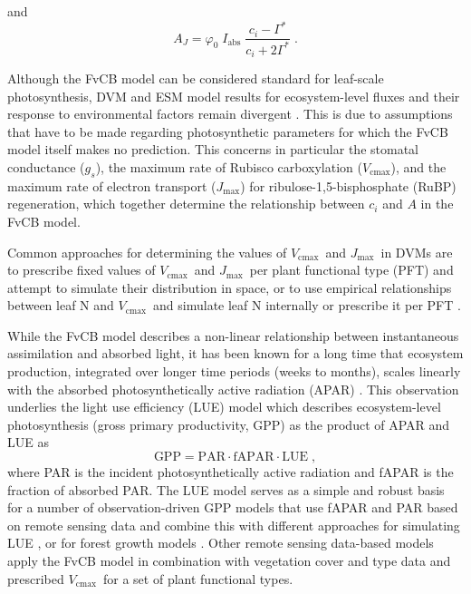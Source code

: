 \documentclass{myreport}
\newcommand{\vcmax}{$V_{\text{cmax}}$}
\newcommand{\jmax}{$J_{\text{max}}$}
\begin{document}
and 
\begin{equation}
\label{eq:aj}
    A_J = \varphi_0 \; I_{\mathrm{abs}}\;\frac{c_i - \Gamma^{\ast}}{c_i + 2\Gamma^{\ast}} \;.
\end{equation}

Although the FvCB model can be considered standard for leaf-scale photosynthesis, DVM and ESM model results for ecosystem-level fluxes and their response to environmental factors remain divergent \citep{rogers17}. This is due to assumptions that have to be made regarding photosynthetic parameters for which the FvCB model itself makes no prediction. This concerns in particular the stomatal conductance ($g_s$), the maximum rate of Rubisco carboxylation (\vcmax ), and the maximum rate of electron transport (\jmax ) for ribulose-1,5-bisphosphate (RuBP) regeneration, which together determine the relationship between $c_i$ and $A$ in the FvCB model. 

Common approaches for determining the values of \vcmax\ and \jmax\ in DVMs are to prescribe fixed values of \vcmax\ and \jmax\ per plant functional type (PFT) and attempt to simulate their distribution in space, or to use empirical relationships between leaf N and \vcmax\ and simulate leaf N internally or prescribe it per PFT \citep{smithdukes13gcb, rogers14}. 

While the FvCB model describes a non-linear relationship between instantaneous assimilation and absorbed light, it has been known for a long time that ecosystem production, integrated over longer time periods (weeks to months), scales linearly with the absorbed photosynthetically active radiation (APAR) \citep{monteith72, medlyn98}. This observation underlies the light use efficiency (LUE) model which describes ecosystem-level photosynthesis (gross primary productivity, GPP) as the product of APAR and LUE as
\begin{equation}
\label{eq:luemodel}
\text{GPP} = \text{PAR} \cdot \text{fAPAR} \cdot \text{LUE} \;,
\end{equation}
where PAR is the incident photosynthetically active radiation and fAPAR is the fraction of absorbed PAR. The LUE model serves as a simple and robust basis for a number of observation-driven GPP models that use fAPAR and PAR based on remote sensing data and combine this with different approaches for simulating LUE \citep{running04, Zhang2017-yr, field95rse}, or for forest growth models \citep{landsberg97fem}. Other remote sensing data-based models \citep{jiang16rse} apply the FvCB model in combination with vegetation cover and type data and prescribed \vcmax\ for a set of plant functional types.
\end{document}
